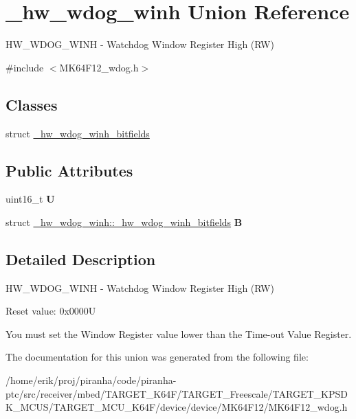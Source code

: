 \hypertarget{union__hw__wdog__winh}{}\section{\+\_\+hw\+\_\+wdog\+\_\+winh Union Reference}
\label{union__hw__wdog__winh}


H\+W\+\_\+\+W\+D\+O\+G\+\_\+\+W\+I\+NH -\/ Watchdog Window Register High (RW)  




{\ttfamily \#include $<$M\+K64\+F12\+\_\+wdog.\+h$>$}

\subsection*{Classes}
\begin{DoxyCompactItemize}
\item 
struct \hyperlink{struct__hw__wdog__winh_1_1__hw__wdog__winh__bitfields}{\+\_\+hw\+\_\+wdog\+\_\+winh\+\_\+bitfields}
\end{DoxyCompactItemize}
\subsection*{Public Attributes}
\begin{DoxyCompactItemize}
\item 
uint16\+\_\+t {\bfseries U}\hypertarget{union__hw__wdog__winh_a0af5b49be8d1a650d0dcad0531a64972}{}\label{union__hw__wdog__winh_a0af5b49be8d1a650d0dcad0531a64972}

\item 
struct \hyperlink{struct__hw__wdog__winh_1_1__hw__wdog__winh__bitfields}{\+\_\+hw\+\_\+wdog\+\_\+winh\+::\+\_\+hw\+\_\+wdog\+\_\+winh\+\_\+bitfields} {\bfseries B}\hypertarget{union__hw__wdog__winh_a05254c65f9ba5ce0377aa83806cb33fc}{}\label{union__hw__wdog__winh_a05254c65f9ba5ce0377aa83806cb33fc}

\end{DoxyCompactItemize}


\subsection{Detailed Description}
H\+W\+\_\+\+W\+D\+O\+G\+\_\+\+W\+I\+NH -\/ Watchdog Window Register High (RW) 

Reset value\+: 0x0000U

You must set the Window Register value lower than the Time-\/out Value Register. 

The documentation for this union was generated from the following file\+:\begin{DoxyCompactItemize}
\item 
/home/erik/proj/piranha/code/piranha-\/ptc/src/receiver/mbed/\+T\+A\+R\+G\+E\+T\+\_\+\+K64\+F/\+T\+A\+R\+G\+E\+T\+\_\+\+Freescale/\+T\+A\+R\+G\+E\+T\+\_\+\+K\+P\+S\+D\+K\+\_\+\+M\+C\+U\+S/\+T\+A\+R\+G\+E\+T\+\_\+\+M\+C\+U\+\_\+\+K64\+F/device/device/\+M\+K64\+F12/M\+K64\+F12\+\_\+wdog.\+h\end{DoxyCompactItemize}
